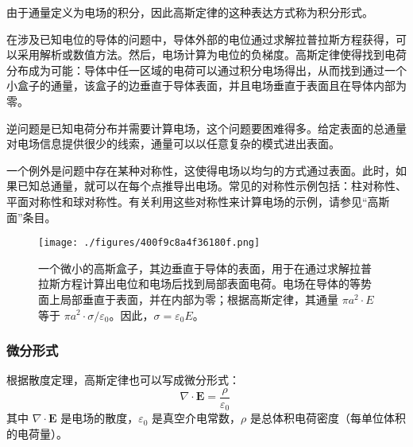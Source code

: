 由于通量定义为电场的积分，因此高斯定律的这种表达方式称为积分形式。

在涉及已知电位的导体的问题中，导体外部的电位通过求解拉普拉斯方程获得，可以采用解析或数值方法。然后，电场计算为电位的负梯度。高斯定律使得找到电荷分布成为可能：导体中任一区域的电荷可以通过积分电场得出，从而找到通过一个小盒子的通量，该盒子的边垂直于导体表面，并且电场垂直于表面且在导体内部为零。

逆问题是已知电荷分布并需要计算电场，这个问题要困难得多。给定表面的总通量对电场信息提供很少的线索，通量可以以任意复杂的模式进出表面。

一个例外是问题中存在某种对称性，这使得电场以均匀的方式通过表面。此时，如果已知总通量，就可以在每个点推导出电场。常见的对称性示例包括：柱对称性、平面对称性和球对称性。有关利用这些对称性来计算电场的示例，请参见“高斯面”条目。
\begin{figure}[ht]
\centering
\texttt{[image: ./figures/400f9c8a4f36180f.png]}
\caption{一个微小的高斯盒子，其边垂直于导体的表面，用于在通过求解拉普拉斯方程计算出电位和电场后找到局部表面电荷。电场在导体的等势面上局部垂直于表面，并在内部为零；根据高斯定律，其通量 \( \pi a^2 \cdot E \) 等于 \( \pi a^2 \cdot \sigma / \varepsilon_0 \)。因此，\(\sigma = \varepsilon_0 E\)。} \label{fig_GSDL_4}
\end{figure}
\subsubsection{微分形式}
根据散度定理，高斯定律也可以写成微分形式：
\[
\nabla \cdot \mathbf{E} = \frac{\rho}{\varepsilon_0}~
\]
其中 \(\nabla \cdot \mathbf{E}\) 是电场的散度，\(\varepsilon_0\) 是真空介电常数，\(\rho\) 是总体积电荷密度（每单位体积的电荷量）。